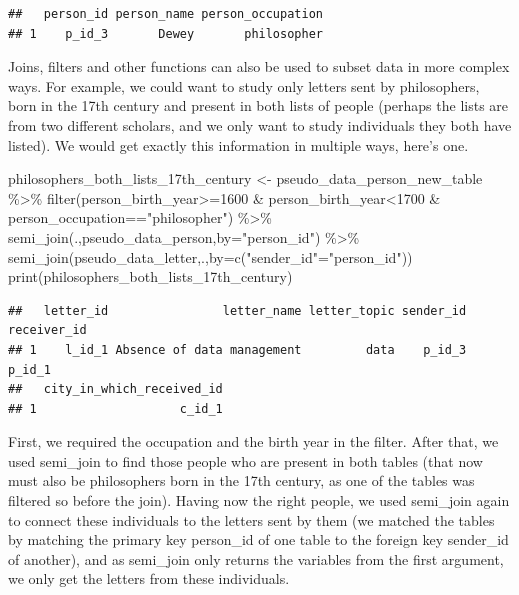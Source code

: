 \documentclass[
]{book}
\newenvironment{Shaded}{\begin{snugshade}}{\end{snugshade}}
\newcommand{\AttributeTok}[1]{\textcolor[rgb]{0.77,0.63,0.00}{#1}}
\newcommand{\DecValTok}[1]{\textcolor[rgb]{0.00,0.00,0.81}{#1}}
\newcommand{\FunctionTok}[1]{\textcolor[rgb]{0.00,0.00,0.00}{#1}}
\newcommand{\NormalTok}[1]{#1}
\newcommand{\OtherTok}[1]{\textcolor[rgb]{0.56,0.35,0.01}{#1}}
\newcommand{\SpecialCharTok}[1]{\textcolor[rgb]{0.00,0.00,0.00}{#1}}
\newcommand{\StringTok}[1]{\textcolor[rgb]{0.31,0.60,0.02}{#1}}
\begin{document}
\begin{verbatim}
##   person_id person_name person_occupation
## 1    p_id_3       Dewey       philosopher
\end{verbatim}

Joins, filters and other functions can also be used to subset data in more complex ways. For example, we could
want to study only letters sent by philosophers, born in the 17th century and present in both lists of people (perhaps the lists are from two different scholars, and we only want to study individuals they both have listed). We would get exactly this information in multiple ways, here's one.

\begin{Shaded}
\begin{Highlighting}[]
\NormalTok{philosophers\_both\_lists\_17th\_century }\OtherTok{\textless{}{-}}\NormalTok{ pseudo\_data\_person\_new\_table }\SpecialCharTok{\%\textgreater{}\%} \FunctionTok{filter}\NormalTok{(person\_birth\_year}\SpecialCharTok{\textgreater{}=}\DecValTok{1600} \SpecialCharTok{\&}\NormalTok{ person\_birth\_year}\SpecialCharTok{\textless{}}\DecValTok{1700} \SpecialCharTok{\&}\NormalTok{ person\_occupation}\SpecialCharTok{==}\StringTok{"philosopher"}\NormalTok{) }\SpecialCharTok{\%\textgreater{}\%} \FunctionTok{semi\_join}\NormalTok{(.,pseudo\_data\_person,}\AttributeTok{by=}\StringTok{"person\_id"}\NormalTok{) }\SpecialCharTok{\%\textgreater{}\%} \FunctionTok{semi\_join}\NormalTok{(pseudo\_data\_letter,.,}\AttributeTok{by=}\FunctionTok{c}\NormalTok{(}\StringTok{"sender\_id"}\OtherTok{=}\StringTok{"person\_id"}\NormalTok{))}
\FunctionTok{print}\NormalTok{(philosophers\_both\_lists\_17th\_century)}
\end{Highlighting}
\end{Shaded}

\begin{verbatim}
##   letter_id                letter_name letter_topic sender_id receiver_id
## 1    l_id_1 Absence of data management         data    p_id_3      p_id_1
##   city_in_which_received_id
## 1                    c_id_1
\end{verbatim}

First, we required the occupation and the birth year in the filter. After that, we used semi\_join to find those people who
are present in both tables (that now must also be philosophers born in the 17th century, as one of the tables was filtered so before the join). Having now the right people, we used semi\_join again to connect these individuals to the letters sent by them (we matched the tables by matching the primary key person\_id of one table to the foreign key sender\_id of another), and as semi\_join only returns
the variables from the first argument, we only get the letters from these individuals.
\end{document}
